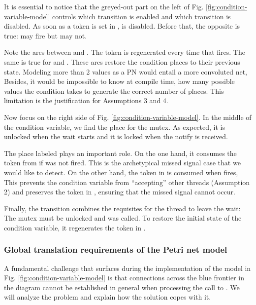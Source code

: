 It is essential to notice that the greyed-out part
on the left of Fig. \ref{fig:condition-variable-model}
controls which transition is enabled and which transition is disabled.
As soon as a token is set in ,  is disabled.
Before that, the opposite is true:  may fire but  may not.

Note the arcs between  and .
The token is regenerated every time that  fires.
The same is true for  and .
These arcs restore the condition places to their previous state.
Modeling more than 2 values as a \acrshort{PN} would entail a more convoluted net,
Besides, it would be impossible to know at compile time,
how many possible values the condition takes to generate the correct number of places.
This limitation is the justification for Assumptions 3 and 4.

Now focus on the right side of Fig. \ref{fig:condition-variable-model}.
In the middle of the condition variable, we find the place for the mutex.
As expected, it is unlocked when the wait starts
and it is locked when the notify is received.

The place labeled  plays an important role.
On the one hand, it consumes the token from 
if  was not fired.
This is the archetypical missed signal case that we would like to detect.
On the other hand, the token in 
is consumed when  fires,
This prevents the condition variable from ``accepting'' other threads (Assumption 2)
and preserves the token in , ensuring that the missed signal cannot occur.

Finally, the  transition combines the requisites
for the thread to leave the wait: The mutex must be unlocked and  was called.
To restore the initial state of the condition variable,
it regenerates the token in .

\subsubsection{Global translation requirements of the Petri net model}

A fundamental challenge that surfaces
during the implementation of the model in Fig. \ref{fig:condition-variable-model}
is that connections across the blue frontier in the diagram cannot be established
in general when processing the call to .
We will analyze the problem and explain how the solution copes with it.

